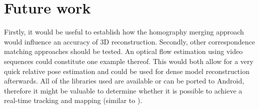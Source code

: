 \section{Future work}
Firstly, it would be useful to establish how the homography merging approach would influence an accuracy of 3D reconstruction. Secondly, 
 other correspondence matching approaches should be tested. An optical flow estimation using video sequences could constitute one example thereof. This would both allow for a very quick relative pose estimation and could be used for dense model reconstruction afterwards. All of the libraries used are available or can be ported to Android, therefore it might be valuable to determine whether it is possible to achieve a real-time tracking and mapping (similar to \cite{ptam}).



